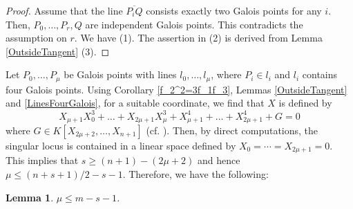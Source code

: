 \documentclass[10pt,oneside]{amsart}
\newtheorem{lemma}{Lemma}
\theoremstyle{definition}
\begin{document}
\begin{proof}
Assume that the line $\overline{P_iQ}$ consists exactly two Galois points for any $i$. 
Then, $P_0, \ldots, P_r, Q$ are independent Galois points. 
This contradicts the assumption on $r$. 
We have (1). 
The assertion in (2) is derived from Lemma \ref{OutsideTangent} (3). 
\end{proof}

Let $P_0,\ldots, P_{\mu}$ be Galois points with lines $l_0, \ldots, l_{\mu}$, where $P_i \in l_i$ and $l_i$ contains four Galois points. 
Using Corollary \ref{f_2^2=3f_1f_3}, Lemmas \ref{OutsideTangent} and \ref{LinesFourGalois}, for a suitable coordinate, we find that $X$ is defined by  
$$ X_{\mu+1}X_0^3+\dots+X_{2\mu+1}X_{\mu}^3+X_{\mu+1}^4+\dots+X_{2\mu+1}^4+G=0 $$
where $G \in K[X_{2\mu+2}, \ldots, X_{n+1}]$ (cf. \cite[p. 532]{yoshihara3}). 
Then, by direct computations, the singular locus is contained in a linear space defined by $X_0=\cdots=X_{2\mu+1}=0$. 
This implies that $s \ge (n+1)-(2\mu+2)$ and hence $\mu \le (n+s+1)/2-s-1$. 
Therefore, we have the following:

\begin{lemma} \label{restrict-mu}
$\mu \le m-s-1$.  
\end{lemma}
\end{document}

